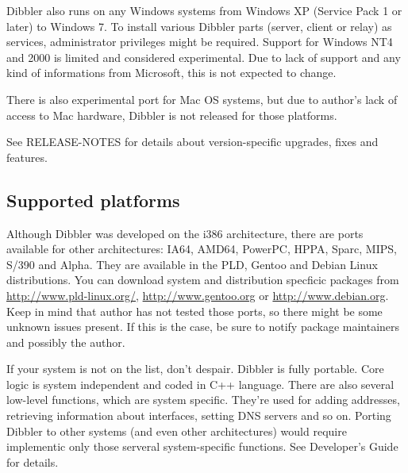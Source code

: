 Dibbler also runs on any Windows systems from Windows XP (Service Pack
1 or later) to Windows 7. To install various Dibbler parts (server,
client or relay) as services, administrator privileges might be
required. Support for Windows NT4 and 2000 is limited and considered
experimental. Due to lack of support and any kind of informations from
Microsoft, this is not expected to change.

There is also experimental port for Mac OS systems, but due to
author's lack of access to Mac hardware, Dibbler is not released for
those platforms.

See RELEASE-NOTES for details about version-specific upgrades, fixes
and features.

\subsection{Supported platforms}
Although Dibbler was developed on the i386 architecture, there
are ports available for other architectures: IA64, AMD64, PowerPC,
HPPA, Sparc, MIPS, S/390 and Alpha. They are available in the PLD,
Gentoo and Debian Linux distributions. You can download system and
distribution specficic packages from \url{http://www.pld-linux.org/},
\url{http://www.gentoo.org} or \url{http://www.debian.org}. Keep in mind
that author has not tested those ports, so there might be some
unknown issues present. If this is the case, be sure to notify package
maintainers and possibly the author.

If your system is not on the list, don't despair. Dibbler is fully
portable. Core logic is system independent and coded in C++
language. There are also several low-level functions, which are system
specific. They're used for adding addresses, retrieving information about
interfaces, setting DNS servers and so on. Porting Dibbler to other
systems (and even other architectures) would require implementic only
those serveral system-specific functions. See Developer's Guide for
details.
